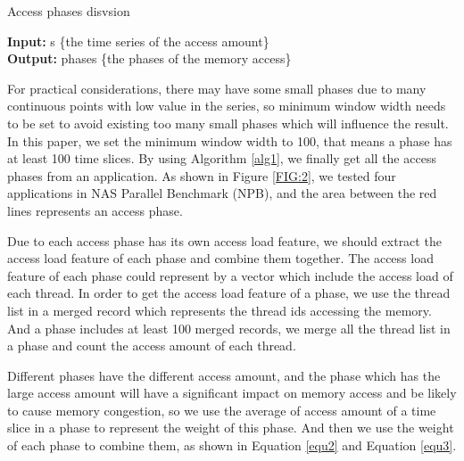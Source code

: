 \documentclass[a4paper,fleqn]{cas-sc}
\begin{document}
\begin{algorithm}
\caption{Access phases disvsion}  \label{alg1}%
\hspace*{0.02in} {\bf Input:} %
s \{the time series of the access amount\}\\
\hspace*{0.02in} {\bf Output:} %
phases \{the phases of the memory access\}
\begin{algorithmic}[1]
\State num = len(s) $
\State low\_value = mean(sorted(s)[:num])
\State left = 0 ; right = 0
\State min\_width = 100
\While{right <= len(s)} {%
 	\If {s[right] <= low\_value and right - left >= min\_width} 
	 	\State phases.append(s[left : right+1])
 		\State left=right
	\EndIf 
	 \State right+=1
\EndWhile
\State \Return phases
\end{algorithmic}
\end{algorithm}

For practical considerations, there may have some small phases due to many continuous points with low value in the series, so minimum window width needs to be set to avoid existing too many small phases which will influence the result. In this paper, we set the minimum window width to 100, that means a phase has at least 100 time slices. By using Algorithm \ref{alg1}, we finally get all the access phases from an application. As shown in Figure \ref{FIG:2}, we tested four applications in NAS Parallel Benchmark (NPB), and the area between the red lines represents an access phase.

Due to each access phase has its own access load feature, we should extract the access load feature of each phase and combine them together. The access load feature of each phase could represent by a vector which include the access load of  each thread. In order to get the access load feature of a phase, we use the thread list in a merged record which represents the thread ids accessing the memory. And a phase includes at least 100 merged records, we merge all the thread list in a phase and count the access amount of each thread. 

Different phases have the different access amount, and the phase which has the large access amount will have a significant impact on memory access and be likely to cause memory congestion, so we use the average of access amount of a time slice in a phase to represent the weight of this phase. And then we use the weight of each phase to combine them, as shown in Equation \ref{equ2} and Equation \ref{equ3}.
\end{document}

